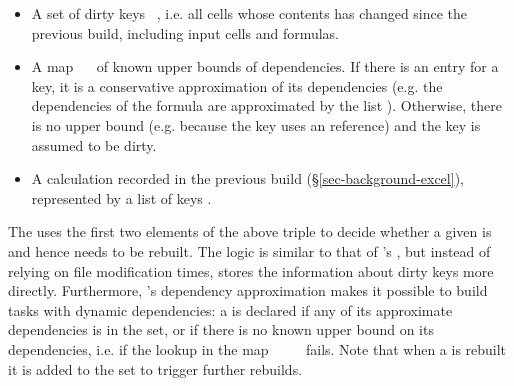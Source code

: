 \begin{itemize}
    \item A set of dirty keys ~, i.e. all cells whose contents
          has changed since the previous build, including input cells and
          formulas.
    \item A map ~~\hs{[@@k]} of known upper bounds of
          dependencies. If there is an entry for a key, it is a conservative
          approximation of its dependencies (e.g. the dependencies of the
          formula  are approximated by the list
          \hs{[}\hs{,}\hs{,}\hs{]}). Otherwise, there is
          no upper bound (e.g. because the key uses an  reference)
          and the key is assumed to be dirty.
    \item A calculation  recorded in the previous build
          (\S\ref{sec-background-excel}), represented by a list of keys \hs{[@@k]}.
\end{itemize}

The  uses the first two elements of the above triple
to decide whether a given  is  and hence needs to be rebuilt.
The logic is similar to that of \Make's , but instead of
relying on file modification times, \Excel stores the information about dirty
keys more directly. Furthermore, \Excel's dependency approximation makes it
possible to build tasks with dynamic dependencies: a  is declared
 if any of its approximate dependencies is in the  set,
or if there is no known upper bound on its dependencies, i.e. if the lookup in
the map ~\hs{::}~~~\hs{[@@k]} fails. Note that when a
 is rebuilt it is added to the set  to trigger further
rebuilds.

